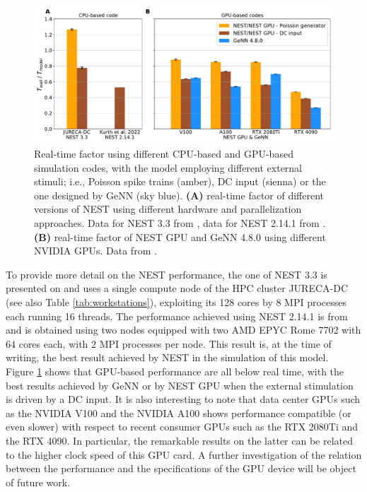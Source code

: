 \documentclass[a4paper, 12pt, twoside, openright]{book}
\begin{document}
\begin{figure}[H]
    \centering
    \includegraphics[width=\columnwidth]{figures/cm_overall_real_time_fact.pdf}
    \caption{Real-time factor using different CPU-based and GPU-based simulation codes, with the model employing different external stimuli; i.e., Poisson spike trains (amber), DC input (sienna) or the one designed by GeNN (sky blue). \textbf{(A)} real-time factor of different versions of NEST using different hardware and parallelization approaches. Data for NEST 3.3 from \cite{Golosio2023}, data for NEST 2.14.1 from \cite{Kurth2022}. \textbf{(B)} real-time factor of NEST GPU and GeNN 4.8.0 using different NVIDIA GPUs. Data from \cite{Golosio2023}.}
    \label{fig:cm_overall_RTF}
\end{figure}

To provide more detail on the NEST performance, the one of NEST 3.3 is presented on \cite{Golosio2023} and uses a single compute node of the HPC cluster JURECA-DC \cite{JURECA} (see also Table \ref{tab:workstations}), exploiting its 128 cores by 8 MPI processes each running 16 threads. The performance achieved using NEST 2.14.1 \cite{nest2.14.1} is from \cite{Kurth2022} and is obtained using two nodes equipped with two AMD EPYC Rome 7702 with $64$ cores each, with $2$ MPI processes per node. This result is, at the time of writing, the best result achieved by NEST in the simulation of this model.\\
Figure \ref{fig:cm_overall_RTF} shows that GPU-based performance are all below real time, with the best results achieved by GeNN or by NEST GPU when the external stimulation is driven by a DC input. It is also interesting to note that data center GPUs such as the NVIDIA V100 and the NVIDIA A100 shows performance compatible (or even slower) with respect to recent consumer GPUs such as the RTX 2080Ti and the RTX 4090. In particular, the remarkable results on the latter can be related to the higher clock speed of this GPU card. A further investigation of the relation between the performance and the specifications of the GPU device will be object of future work.
\end{document}
